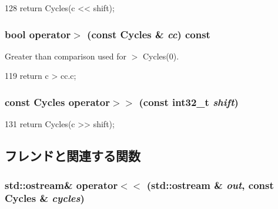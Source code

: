 \begin{DoxyCode}
128     { return Cycles(c << shift); }
\end{DoxyCode}
\hypertarget{classCycles_ad7b0acbf9ef316371ab5193f6bd396cf}{
\subsubsection[{operator$>$}]{\setlength{\rightskip}{0pt plus 5cm}bool operator$>$ (const {\bf Cycles} \& {\em cc}) const}}
\label{classCycles_ad7b0acbf9ef316371ab5193f6bd396cf}
Greater than comparison used for $>$ Cycles(0). 


\begin{DoxyCode}
119     { return c > cc.c; }
\end{DoxyCode}
\hypertarget{classCycles_a2a6fb5f9c9b4055e4f24fd84f5fcbf59}{
\subsubsection[{operator$>$$>$}]{\setlength{\rightskip}{0pt plus 5cm}const {\bf Cycles} operator$>$$>$ (const int32\_\-t {\em shift})}}
\label{classCycles_a2a6fb5f9c9b4055e4f24fd84f5fcbf59}



\begin{DoxyCode}
131     { return Cycles(c >> shift); }
\end{DoxyCode}


\subsection{フレンドと関連する関数}
\hypertarget{classCycles_a1afa18482d21eabd38b7a50c54e10200}{
\subsubsection[{operator$<$$<$}]{\setlength{\rightskip}{0pt plus 5cm}std::ostream\& operator$<$$<$ (std::ostream \& {\em out}, \/  const {\bf Cycles} \& {\em cycles})}}
\label{classCycles_a1afa18482d21eabd38b7a50c54e10200}



